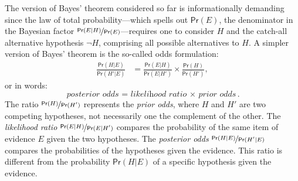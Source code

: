 \documentclass{article}
\newcommand{\pr}{\mathsf{Pr}}
\begin{document}
The version of Bayes' theorem considered so far is informationally demanding since 
the law of total probability---which spells out $\pr(E)$, the denominator in the Bayesian factor $\nicefrac{\pr(E \vert H)}{\pr(E)}$---requires one to consider $H$ and the catch-all alternative hypothesis $\neg H$, comprising all possible alternatives to $H$.  %
A simpler version of Bayes' theorem is 
 the so-called odds 
formulation: 
%
\begin{align*}\frac{\pr(H \vert E)} {\pr(H' \vert E)}& = \frac{\pr(E \vert H)}{\pr(E \vert H')} \times \frac{\pr(H)} {\pr(H')}, \end{align*}
%
or in words:
\[\textit{posterior odds = likelihood ratio $\times$ prior odds}. \]
%
The ratio $\nicefrac{\pr(H)}{\pr(H')}$ represents the \textit{prior odds}, where $H$ and $H'$ are two competing hypotheses, not necessarily one the complement of the other.  
%
The \textit{likelihood ratio} $\nicefrac{\pr(E \vert H)}{\pr(E \vert H')}$ 
compares the probability of the same item of evidence $E$ given the two 
hypotheses. 
The \textit{posterior odds} $\nicefrac{\pr(H \vert E)}{\pr(H' \vert E)}$ compares the probabilities of the  hypotheses given the evidence. This ratio is different from the probability $\pr(H \vert E)$ of a specific hypothesis given the evidence.
%
\end{document}
